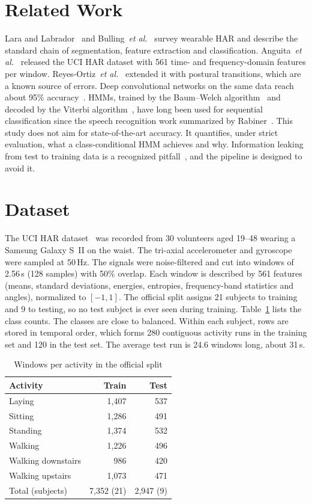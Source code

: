\documentclass[conference]{IEEEtran}
\begin{document}
\section{Related Work}
Lara and Labrador~\cite{lara2013survey} and Bulling~\emph{et al.}~\cite{bulling2014tutorial} survey wearable HAR and describe the standard chain of segmentation, feature extraction and classification. Anguita~\emph{et al.}~\cite{anguita2013public} released the UCI HAR dataset with 561 time- and frequency-domain features per window. Reyes-Ortiz~\emph{et al.}~\cite{reyesortiz2016transition} extended it with postural transitions, which are a known source of errors. Deep convolutional networks on the same data reach about 95\% accuracy~\cite{ronao2016human}. HMMs, trained by the Baum--Welch algorithm~\cite{baum1970maximization} and decoded by the Viterbi algorithm~\cite{viterbi1967error}, have long been used for sequential classification since the speech recognition work summarized by Rabiner~\cite{rabiner1989tutorial}. This study does not aim for state-of-the-art accuracy. It quantifies, under strict evaluation, what a class-conditional HMM achieves and why. Information leaking from test to training data is a recognized pitfall~\cite{kaufman2012leakage}, and the pipeline is designed to avoid it.

\section{Dataset}
The UCI HAR dataset~\cite{anguita2013public} was recorded from 30 volunteers aged 19--48 wearing a Samsung Galaxy S~II on the waist. The tri-axial accelerometer and gyroscope were sampled at 50\,Hz. The signals were noise-filtered and cut into windows of 2.56\,s (128 samples) with 50\% overlap. Each window is described by 561 features (means, standard deviations, energies, entropies, frequency-band statistics and angles), normalized to $[-1,1]$. The official split assigns 21 subjects to training and 9 to testing, so no test subject is ever seen during training. Table~\ref{tab:data} lists the class counts. The classes are close to balanced. Within each subject, rows are stored in temporal order, which forms 280 contiguous activity runs in the training set and 120 in the test set. The average test run is 24.6 windows long, about 31\,s.

\begin{table}[t]
\caption{Windows per activity in the official split}
\label{tab:data}
\centering
\begin{tabular}{lrr}
\toprule
Activity & Train & Test \\
\midrule
Laying & 1,407 & 537 \\
Sitting & 1,286 & 491 \\
Standing & 1,374 & 532 \\
Walking & 1,226 & 496 \\
Walking downstairs & 986 & 420 \\
Walking upstairs & 1,073 & 471 \\
\midrule
Total (subjects) & 7,352 (21) & 2,947 (9) \\
\bottomrule
\end{tabular}
\end{table}
\end{document}
